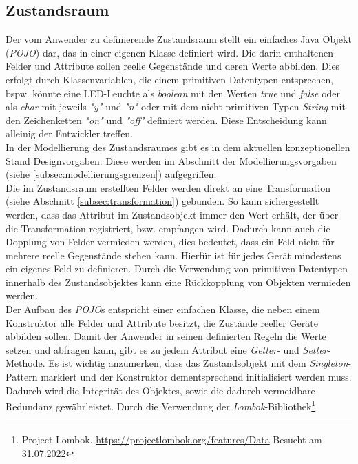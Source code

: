 \subsection{Zustandsraum}
\label{subsec:zustandsraum}
    Der vom Anwender zu definierende Zustandsraum stellt ein einfaches Java Objekt (\textit{\acs{POJO}}) dar, das in einer eigenen Klasse definiert wird. 
    Die darin enthaltenen Felder und Attribute sollen reelle Gegenstände und deren Werte abbilden. Dies erfolgt durch 
    Klassenvariablen, die einem primitiven Datentypen entsprechen, bspw. könnte eine LED-Leuchte als \textit{boolean} mit den 
    Werten \textit{true} und \textit{false} oder als \textit{char} mit jeweils \textit{"y"} und \textit{"n"} oder mit dem nicht primitiven 
    Typen \textit{String} mit den Zeichenketten \textit{"on"} und \textit{"off"} definiert 
    werden. Diese Entscheidung kann alleinig der Entwickler treffen. 
    \\
    \linebreak
    In der Modellierung des Zustandsraumes gibt es in dem aktuellen konzeptionellen Stand Designvorgaben. Diese werden im Abschnitt der 
    Modellierungsvorgaben (siehe \ref{subsec:modellierungsgrenzen}) aufgegriffen. 
    \\
    Die im Zustandsraum erstellten Felder werden direkt an eine Transformation (siehe Abschnitt \ref{subsec:transformation}) gebunden. So kann sichergestellt werden, dass 
    das Attribut im Zustandsobjekt immer den Wert erhält, der über die Transformation registriert, bzw. empfangen wird. Dadurch kann 
    auch die Dopplung von Felder vermieden werden, dies bedeutet, dass ein Feld nicht für mehrere reelle Gegenstände stehen kann. Hierfür ist für jedes 
    Gerät mindestens ein eigenes Feld zu definieren. Durch die Verwendung von primitiven Datentypen innerhalb 
    des Zustandsobjektes kann eine Rückkopplung von Objekten vermieden werden. 
    \\
    \linebreak
    Der Aufbau des \textit{\acs{POJO}}s entspricht einer einfachen Klasse, die neben einem Konstruktor alle Felder und Attribute besitzt, die Zustände reeller 
    Geräte abbilden sollen. Damit der Anwender in seinen definierten Regeln die Werte setzen und abfragen kann, gibt es zu jedem Attribut eine \textit{Getter}- und \textit{Setter}-Methode.
    Es ist wichtig anzumerken, dass das Zustandsobjekt mit dem \textit{Singleton}-Pattern markiert und der Konstruktor dementsprechend initialisiert werden muss. Dadurch wird 
    die Integrität des Objektes, sowie die dadurch vermeidbare Redundanz gewährleistet. Durch die Verwendung der \textit{Lombok}-Bibliothek\footnote{Project Lombok. \url{https://projectlombok.org/features/Data} Besucht am 31.07.2022} 
